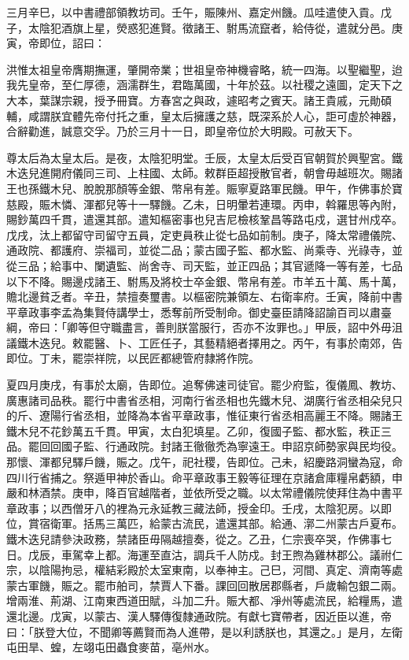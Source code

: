 \begin{pinyinscope}
 三月辛巳，以中書禮部領教坊司。壬午，賑陳州、嘉定州饑。瓜哇遣使入貢。戊子，太陰犯酒旗上星，熒惑犯進賢。徵諸王、駙馬流竄者，給侍從，遣就分邑。庚寅，帝即位，詔曰：



 洪惟太祖皇帝膺期撫運，肇開帝業；世祖皇帝神機睿略，統一四海。以聖繼聖，迨我先皇帝，至仁厚德，涵濡群生，君臨萬國，十年於茲。以社稷之遠圖，定天下之大本，葉謀宗親，授予冊寶。方春宮之與政，遽昭考之賓天。諸王貴戚，元勛碩輔，咸謂朕宜體先帝付托之重，皇太后擁護之慈，既深系於人心，詎可虛於神器，合辭勸進，誠意交孚。乃於三月十一日，即皇帝位於大明殿。可赦天下。



 尊太后為太皇太后。是夜，太陰犯明堂。壬辰，太皇太后受百官朝賀於興聖宮。鐵木迭兒進開府儀同三司、上柱國、太師。敕群臣超授散官者，朝會毋越班次。賜諸王也孫鐵木兒、脫脫那顏等金銀、幣帛有差。賑寧夏路軍民饑。甲午，作佛事於寶慈殿，賑木憐、渾都兒等十一驛饑。乙未，日明暈若連環。丙申，斡羅思等內附，賜鈔萬四千貫，遣還其部。遣知樞密事也兒吉尼檢核鞏昌等路屯戍，選甘州戍卒。戊戌，汰上都留守司留守五員，定吏員秩止從七品如前制。庚子，降太常禮儀院、通政院、都護府、崇福司，並從二品；蒙古國子監、都水監、尚乘寺、光祿寺，並從三品；給事中、闌遺監、尚舍寺、司天監，並正四品；其官遞降一等有差，七品以下不降。賜邊戍諸王、駙馬及將校士卒金銀、幣帛有差。市羊五十萬、馬十萬，贍北邊貧乏者。辛丑，禁擅奏璽書。以樞密院兼領左、右衛率府。壬寅，降前中書平章政事李孟為集賢侍講學士，悉奪前所受制命。御史臺臣請降詔諭百司以肅臺綱，帝曰：「卿等但守職盡言，善則朕當服行，否亦不汝罪也。」甲辰，詔中外毋沮議鐵木迭兒。敕罷醫、卜、工匠任子，其藝精絕者擇用之。丙午，有事於南郊，告即位。丁未，罷崇祥院，以民匠都總管府隸將作院。



 夏四月庚戌，有事於太廟，告即位。追奪佛速司徒官。罷少府監，復儀鳳、教坊、廣惠諸司品秩。罷行中書省丞相，河南行省丞相也先鐵木兒、湖廣行省丞相朵兒只的斤、遼陽行省丞相，並降為本省平章政事，惟征東行省丞相高麗王不降。賜諸王鐵木兒不花鈔萬五千貫。甲寅，太白犯填星。乙卯，復國子監、都水監，秩正三品。罷回回國子監、行通政院。封諸王徹徹禿為寧遠王。申詔京師勢家與民均役。那懷、渾都兒驛戶饑，賑之。戊午，祀社稷，告即位。己未，紹慶路洞蠻為寇，命四川行省捕之。祭遁甲神於香山。命平章政事王毅等征理在京諸倉庫糧帛虧額，申嚴和林酒禁。庚申，降百官越階者，並依所受之職。以太常禮儀院使拜住為中書平章政事；以西僧牙八的裡為元永延教三藏法師，授金印。壬戌，太陰犯房。以即位，賞宿衛軍。括馬三萬匹，給蒙古流民，遣還其部。給通、漷二州蒙古戶夏布。鐵木迭兒請參決政務，禁諸臣毋隔越擅奏，從之。乙丑，仁宗喪卒哭，作佛事七日。戊辰，車駕幸上都。海運至直沽，調兵千人防戍。封王煦為雞林郡公。議祔仁宗，以陰陽拘忌，權結彩殿於太室東南，以奉神主。己巳，河間、真定、濟南等處蒙古軍饑，賑之。罷市舶司，禁賈人下番。課回回散居郡縣者，戶歲輸包銀二兩。增兩淮、荊湖、江南東西道田賦，斗加二升。賑大都、凈州等處流民，給糧馬，遣還北邊。戊寅，以蒙古、漢人驛傳復隸通政院。有獻七寶帶者，因近臣以進，帝曰：「朕登大位，不聞卿等薦賢而為人進帶，是以利誘朕也，其還之。」是月，左衛屯田旱、蝗，左翊屯田蟲食麥苗，亳州水。




\end{pinyinscope}
